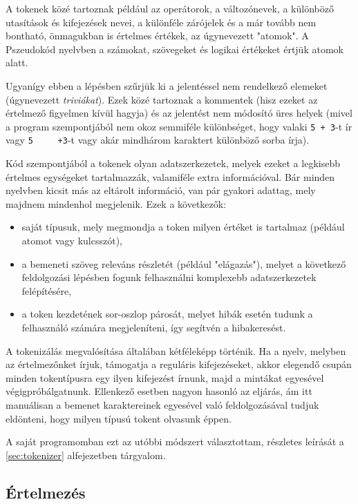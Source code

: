 A tokenek közé tartoznak például az operátorok, a változónevek, a különböző utasítások és kifejezések nevei, a különféle zárójelek és a már tovább nem bontható, önmagukban is értelmes értékek, az úgynevezett "atomok". A Pszeudokód nyelvben a számokat, szövegeket és logikai értékeket értjük atomok alatt.

Ugyanígy ebben a lépésben szűrjük ki a jelentéssel nem rendelkező elemeket (úgynevezett \textit{triviákat}). Ezek közé tartoznak a kommentek (hisz ezeket az értelmező figyelmen kívül hagyja) és az jelentést nem módosító üres helyek (mivel a program szempontjából nem okoz semmiféle különbséget, hogy valaki \verb|5 + 3|-t ír vagy \verb|5     +3|-t vagy akár mindhárom karaktert különböző sorba írja).

Kód szempontjából a tokenek olyan adatszerkezetek, melyek ezeket a legkisebb értelmes egységeket tartalmazzák, valamiféle extra információval. Bár minden nyelvben kicsit más az eltárolt információ, van pár gyakori adattag, mely majdnem mindenhol megjelenik. Ezek a következők:

\begin{itemize}
    \item saját típusuk, mely megmondja a token milyen értéket is tartalmaz (például atomot vagy kulcsszót),
    \item a bemeneti szöveg releváns részletét (például "elágazás"), melyet a következő feldolgozási lépésben fogunk felhasználni komplexebb adatszerkezetek felépítésére,
    \item a token kezdetének sor-oszlop párosát, melyet hibák esetén tudunk a felhasználó számára megjeleníteni, így segítvén a hibakeresést.
\end{itemize}

A tokenizálás megvalósítása általában kétféleképp történik. Ha a nyelv, melyben az értelmezőnket írjuk, támogatja a reguláris kifejezéseket, akkor elegendő csupán minden tokentípusra egy ilyen kifejezést írnunk, majd a mintákat egyesével végigpróbálgatnunk. Ellenkező esetben nagyon hasonló az eljárás, ám itt manuálisan a bemenet karaktereinek egyesével való feldolgozásával tudjuk eldönteni, hogy milyen típusú tokent olvasunk éppen.

A saját programomban ezt az utóbbi módszert választottam, részletes leírását a \ref{sec:tokenizer} alfejezetben tárgyalom.

\subsection{Értelmezés}


